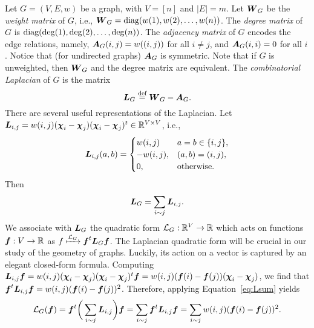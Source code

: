 Let $G=(V,E,w)$ be a graph, with $V=[n]$ and $|E|=m$. 
Let $\vb*{W}_G$ be the \emph{weight matrix} of $G$, i.e., $\vb*{W}_G=\text{diag}(w(1),w(2),\dots,w(n))$. 
The \emph{degree matrix} of $G$ is $\text{diag}(\deg(1),\deg(2),\dots,\deg(n))$. 
The \emph{adjacency matrix} of $G$ encodes the edge relations, namely, $\vb*{A}_G(i,j)=w((i,j))$ for all $i\neq j$, and $\vb*{A}_G(i,i)=0$ for all $i$. Notice that (for undirected graphs) $\vb*{A}_G$ is symmetric.  Note that if $G$ is unweighted, then $\vb*{W}_G$ and the degree matrix are equivalent. 
The \emph{combinatorial Laplacian} of $G$ is the matrix 
\begin{equation}
\label{eq:L_G}
\vb*{L}_G\overset{\text{def}}{=} \vb*{W}_G-\vb*{A}_G.
\end{equation}
There are several useful representations of the Laplacian. Let $\vb*{L}_{i,j}=w(i,j)(\boldsymbol{\chi}_i-\boldsymbol{\chi}_j) (\boldsymbol{\chi}_i-\boldsymbol{\chi}_j)^t\in \mathbb{R}^{V\times V}$, i.e., 
\[\vb*{L}_{i,j}(a,b)=\begin{cases}
w(i,j)&a=b\in\{i,j\},\\
-w(i,j),&(a,b)=(i,j),\\
0,&\text{otherwise}.
\end{cases}\]
Then 
\begin{equation}
\label{eq:Lsum}
    \vb*{L}_G=\sum_{i\sim j}\vb*{L}_{i,j}.
\end{equation}
We associate with $\vb*{L}_G$ the quadratic form $\mathcal{L}_G:\mathbb{R}^V\to \mathbb{R}$ which acts on functions $\vb*{f}:V\to \mathbb{R}$ as $f\xmapsto{\mathcal{L}_G} \vb*{f}^t \vb*{L}_G \vb*{f}$.
The Laplacian quadratic form will be crucial in our study of the geometry of graphs. Luckily, its action on a vector is captured by an elegant closed-form formula. 
Computing 
$\vb*{L}_{i,j}\vb*{f} = w(i,j)(\boldsymbol{\chi}_i -\boldsymbol{\chi}_j)(\boldsymbol{\chi}_i-\boldsymbol{\chi}_j)^t \vb*{f} = w(i,j)(\vb*{f}(i)-\vb*{f}(j))(\boldsymbol{\chi}_i-\boldsymbol{\chi}_j)$,
we find that 
$\vb*{f}^t \vb*{L}_{i,j} \vb*{f} = w(i,j)(\vb*{f}(i)-\vb*{f}(j))^2$.
Therefore, applying Equation~\eqref{eq:Lsum} yields 
\begin{equation}
\label{eq:Lf}
    \mathcal{L}_G(\vb*{f}) = \vb*{f}^t \bigg(\sum_{i\sim j} \vb*{L}_{i,j}\bigg) \vb*{f} = \sum_{i\sim j}\vb*{f}^t \vb*{L}_{i,j} \vb*{f}= \sum_{i\sim j} w(i,j)(\vb*{f}(i)-\vb*{f}(j))^2.
\end{equation}

